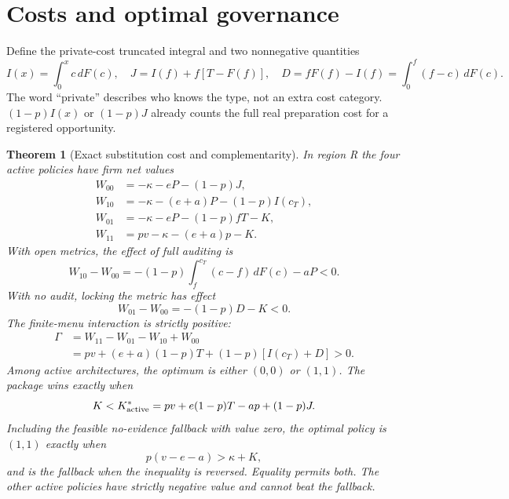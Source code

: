\documentclass[11pt]{article}
\newtheorem{theorem}{Theorem}
\begin{document}
\section{Costs and optimal governance}\label{sec:policy}
Define the private-cost truncated integral and two nonnegative quantities
\begin{equation}I(x)=\int_0^x c\,dF(c),\quad J=I(f)+f[T-F(f)],\quad D=fF(f)-I(f)=\int_0^f(f-c)\,dF(c).\label{eq:costs}\end{equation}
The word ``private'' describes who knows the type, not an extra cost category. $(1-p)I(x)$ or $(1-p)J$ already counts the full real preparation cost for a registered opportunity.
\begin{theorem}[Exact substitution cost and complementarity]\label{thm:policy}
In region R the four active policies have firm net values
\begin{align}
W_{00}&=-\kappa-eP-(1-p)J,\label{eq:w00}\\
W_{10}&=-\kappa-(e+a)P-(1-p)I(c_T),\label{eq:w10}\\
W_{01}&=-\kappa-eP-(1-p)fT-K,\label{eq:w01}\\
W_{11}&=pv-\kappa-(e+a)p-K.\label{eq:w11}
\end{align}
With open metrics, the effect of full auditing is
\begin{equation}W_{10}-W_{00}=-(1-p)\int_f^{c_T}(c-f)\,dF(c)-aP<0.\label{eq:auditloss}\end{equation}
With no audit, locking the metric has effect
\begin{equation}W_{01}-W_{00}=-(1-p)D-K<0.\label{eq:lockloss}\end{equation}
The finite-menu interaction is strictly positive:
\begin{equation}\begin{split}
\Gamma&=W_{11}-W_{01}-W_{10}+W_{00}\\
&=pv+(e+a)(1-p)T+(1-p)[I(c_T)+D]>0.
\end{split}\label{eq:interaction}\end{equation}
Among active architectures, the optimum is either $(0,0)$ or $(1,1)$. The package wins exactly when
\begin{equation}K<K^*_{\rm active}=pv+e(1-p)T-ap+(1-p)J.\label{eq:active}\end{equation}
Including the feasible no-evidence fallback with value zero, the optimal policy is $(1,1)$ exactly when
\begin{equation}p(v-e-a)>\kappa+K,\label{eq:optimal}\end{equation}
and is the fallback when the inequality is reversed. Equality permits both. The other active policies have strictly negative value and cannot beat the fallback.
\end{theorem}
\end{document}
